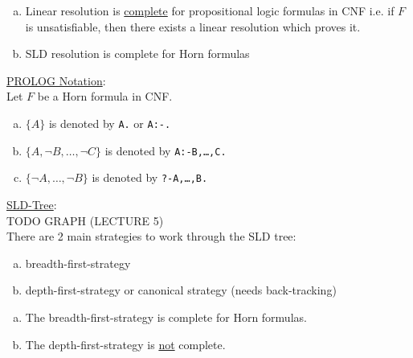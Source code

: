 \documentclass[a4paper]{article}
\newcommand{\ul}{\underline}
\begin{document}
\begin{enumerate}[(a)]
	\item Linear resolution is \ul{complete} for propositional logic formulas in CNF i.e. if $F$ is unsatisfiable, then there exists a linear resolution which proves it.
	\item SLD resolution is complete for Horn formulas
\end{enumerate}
\ul{PROLOG Notation}:\\
Let $F$ be a Horn formula in CNF.
\begin{enumerate}[(a)]
	\item $\{A\}$ is denoted by \texttt{A.} or \texttt{A:-.}
	\item $\{A,\neg B,\dots,\neg C\}$ is denoted by \texttt{A:-B,\dots,C.}
	\item $\{\neg A,\dots,\neg B\}$ is denoted by \texttt{?-A,\dots,B.}
\end{enumerate}
\ul{SLD-Tree}:\\
TODO GRAPH (LECTURE 5)\\
There are 2 main strategies to work through the SLD tree:
\begin{enumerate}[(a)]
	\item breadth-first-strategy
	\item depth-first-strategy or canonical strategy (needs back-tracking)
\end{enumerate}
\begin{enumerate}[(a)]
	\item The breadth-first-strategy is complete for Horn formulas.
	\item The depth-first-strategy is \ul{not} complete.
\end{enumerate}
\end{document}
